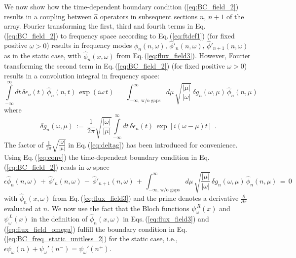 We now show how the time-dependent boundary condition (\ref{eq:BC_field_2}) results in a 
coupling between $\hat{a}$ operators in subsequent sections $n$, $n+1$
of the array. 
Fourier transforming the first, third and fourth terms in Eq.\,(\ref{eq:BC_field_2}) to 
frequency space according to Eq.\,(\ref{eq:ftdef1}) (for fixed positive $\omega>0$) 
results in frequency modes $\hat{\phi}_n(n,\omega)$,
$\hat{\phi}'_n(n,\omega)$, $\hat{\phi}'_{n+1}(n,\omega)$ as in the 
static case, with $\hat{\phi}_n(x,\omega)$ from Eq.\,(\ref{eq:flux_field3}). 
%
However, Fourier transforming the second term in Eq.\,(\ref{eq:BC_field_2}) 
(for fixed positive $\omega>0$) results in a convolution integral in frequency space:
%
\begin{equation} \label{eq:conv}
\int\limits_{-\infty}^{\infty} dt \, \delta \epsilon_n(t) \, \hat{\phi}_n(n,t) \, \exp(i \omega \, t) \, = \,
\int_{-\infty, \, \text{w/o gaps}}^{\infty} d\mu \, \sqrt{\frac{|\mu|}{|\omega|}} \, 
\delta g_n(\omega, \mu) \, \hat{\phi}_n(n,\mu)
\end{equation}
%
where
%
\begin{equation} \label{eq:deltag}
\delta g_n(\omega, \mu) \, := \, \frac{1}{2 \pi}
\sqrt{\frac{|\omega|}{|\mu|}} \int\limits_{-\infty}^{\infty} dt \, \delta \epsilon_n(t) \, 
\exp\left[i (\omega-\mu) t \right] \, \, .
\end{equation}
%
The factor of $\displaystyle{\frac{1}{2 \pi} \sqrt{\frac{|\omega|}{|\mu|}}}$ 
in Eq.\,(\ref{eq:deltag}) has been introduced for convenience.
Using Eq.\,(\ref{eq:conv}) the time-dependent boundary condition in 
Eq.\,(\ref{eq:BC_field_2}) reads in $\omega$-space
%
\begin{equation} \label{eq:bc4b}
\epsilon \hat{\phi}_n(n,\omega) \, + \,
\hat{\phi}'_n(n,\omega) \, - \, \hat{\phi}'_{n+1}(n,\omega) \, + \,
\int_{-\infty, \, \text{w/o gaps}}^{\infty} d\mu \, \sqrt{\frac{|\mu|}{|\omega|}} \, 
\delta g_n(\omega, \mu) \, \hat{\phi}_n(n,\mu) 
 \, = \, 0
\end{equation}
%
with $\hat{\phi}_n(x,\omega)$ from Eq.\,(\ref{eq:flux_field3}) and
the prime denotes a derivative $\displaystyle{\frac{\partial}{\partial x}}$ evaluated at $n$.
We now use the fact that the Bloch functions $\psi_{\omega}^{\,R}(x)$ and $\psi_{\omega}^{\,L}(x)$
in the definition of $\hat{\phi}_n(x,\omega)$ in 
Eqs.\,(\ref{eq:flux_field3}) and (\ref{eq:flux_field_omega}) 
fulfill the boundary condition in Eq.\,(\ref{eq:BC_freq_static_unitless_2}) for the static case, 
i.e., $\epsilon \psi_{\omega}(n) + \psi_{\omega}'(n^-) = \psi_{\omega}'(n^+)$. 
